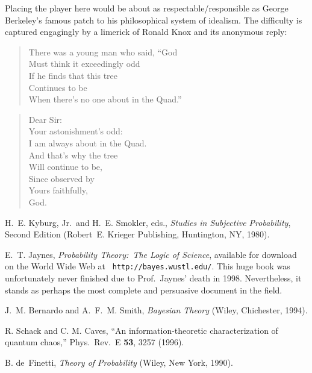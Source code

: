 \begin{thebibliography}{10}
Placing the player here would be about as respectable/responsible as
George Berkeley's famous patch to his philosophical system of
idealism.  The difficulty is captured engagingly by a limerick of
Ronald Knox and its anonymous reply:
\begin{quotation}
\footnotesize
\noindent There was a young man who said, ``God \\
Must think it exceedingly odd \\
If he finds that this tree \\
Continues to be \\
\smallskip When there's no one about in the Quad.''
\end{quotation}
\medskip{}
\begin{quotation}
\footnotesize
\noindent Dear Sir: \\
Your astonishment's odd: \\
I am always about in the Quad. \\
And that's why the tree \\
Will continue to be, \\
Since observed by \\
\indent \indent \indent Yours faithfully, \\
\indent \indent \indent God.
\end{quotation}

H.~E. Kyburg, Jr.\ and H.~E. Smokler, eds., {\sl Studies in
Subjective Probability}, Second Edition (Robert~E. Krieger
Publishing, Huntington, NY, 1980).

E.~T. Jaynes, {\sl Probability Theory:~The Logic of Science},
available for download on the World Wide Web at {\tt
http://bayes.wustl.edu/}.  This huge book was unfortunately never
finished due to Prof.~Jaynes' death in 1998. Nevertheless, it
stands as perhaps the most complete and persuasive document in
the field.

J.~M. Bernardo and A.~F.~M. Smith, {\sl Bayesian Theory} (Wiley,
Chichester, 1994).

R. Schack and C. M. Caves,
``An information-theoretic characterization of quantum chaos,''
Phys.\ Rev.\ E {\bf 53}, 3257 (1996).

B. de~Finetti, {\sl Theory of Probability\/} (Wiley, New York, 1990).


\end{thebibliography}
